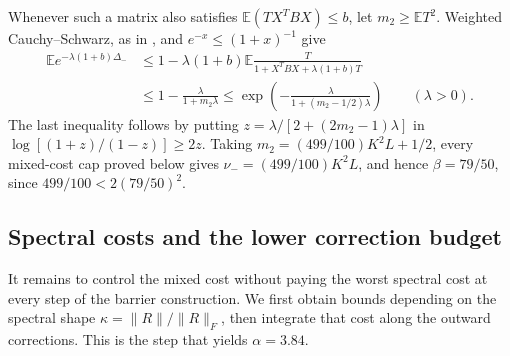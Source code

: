 \documentclass[11pt,a4paper]{article}
\numberwithin{equation}{section}
\begin{document}
Whenever such a matrix also satisfies $\mathbb E(TX^TBX)\le b$,
let $m_2\ge\mathbb ET^2$. Weighted Cauchy--Schwarz, as in
\cite[Lemma~4.2]{yaskov2014lower}, and $e^{-x}\le(1+x)^{-1}$ give
\begin{equation}\label{eq:app-lower-moment-laplace}
 \begin{aligned}
 \mathbb Ee^{-\lambda(1+b)\Delta_-}
 &\le1-\lambda(1+b)\mathbb E
   \frac{T}{1+X^TBX+\lambda(1+b)T}\\
 &\le1-\frac{\lambda}{1+m_2\lambda}
 \le\exp\left(-\frac{\lambda}{1+(m_2-1/2)\lambda}\right)
 \qquad(\lambda>0).
 \end{aligned}
\end{equation}
The last inequality follows by putting
$z=\lambda/[2+(2m_2-1)\lambda]$ in
$\log[(1+z)/(1-z)]\ge2z$.
Taking $m_2=(499/100)K^2L+1/2$, every mixed-cost cap proved below gives
$\nu_-=(499/100)K^2L$, and hence $\beta=79/50$, since
$499/100<2(79/50)^2$.

\subsection{Spectral costs and the lower correction budget}
\label{app:low-two-scale}

It remains to control the mixed cost without paying the worst spectral cost
at every step of the barrier construction. We first obtain bounds depending
on the spectral shape $\kappa=\|R\|/\|R\|_F$, then integrate that cost
along the outward corrections. This is the step that yields $\alpha=3.84$.
\end{document}
